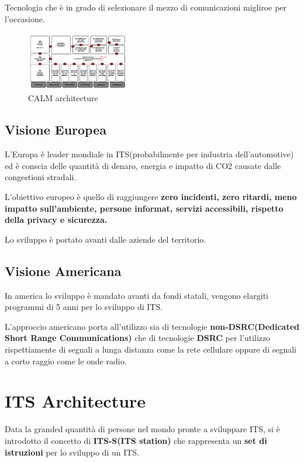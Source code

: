 Tecnologia che è in grado di selezionare il mezzo di comunicazioni migliroe per l'occasione.

\begin{figure}[!ht]
  \centering
  \includegraphics[width=0.4\textwidth]{./images/CALM.png}
  \caption{CALM architecture}
  \label{fig:CALM}
\end{figure}


\subsection{Visione Europea}
L'Europa è leader mondiale in ITS(probabilmente per industria dell'automotive) ed è conscia delle quantità di denaro, energia e impatto di CO2 causate dalle congestioni stradali.

L'obiettivo europeo è quello di raggiungere \textbf{zero incidenti, zero ritardi, meno impatto sull'ambiente, persone informat, servizi accessibili, rispetto della privacy e sicurezza.}

Lo sviluppo è portato avanti dalle aziende del territorio.

\subsection{Visione Americana}
In america lo sviluppo è mandato avanti da fondi statali, vengono elargiti programmi di 5 anni per lo sviluppo di ITS.

L'approccio americano porta all'utilizzo sia di tecnologie \textbf{non-DSRC(Dedicated Short Range Communications)} che di tecnologie \textbf{DSRC} per l'utilizzo rispettiamente di segnali a lunga distanza come la rete cellulare oppure di segnali a corto raggio come le onde radio.




\section{ITS Architecture}

Data la granded quantità di persone nel mondo pronte a sviluppare ITS, si è introdotto il concetto di \textbf{ITS-S(ITS station)} che rappresenta un \textbf{set di istruzioni} per lo sviluppo di un ITS.

